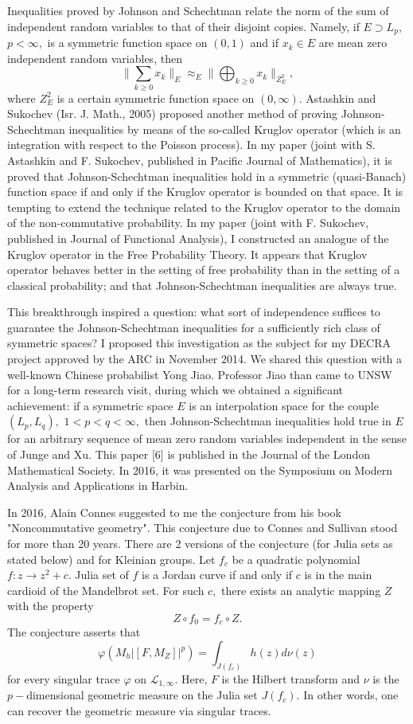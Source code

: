 \documentclass[12pt]{article}
\begin{document}
Inequalities proved by Johnson and Schechtman relate the norm of the sum of independent random variables to that of their disjoint copies. Namely, if $E\supset L_p,$ $p<\infty,$ is a symmetric function space on $(0,1)$ and if $x_k\in E$ are mean zero independent random variables, then
$$\|\sum_{k\geq0}x_k\|_E\approx_E\|\bigoplus_{k\geq0}x_k\|_{Z_E^2},$$
where $Z_E^2$ is a certain symmetric function space on $(0,\infty).$ Astashkin and Sukochev (Isr. J. Math., 2005) proposed another method of proving Johnson-Schechtman inequalities by means of the so-called Kruglov operator (which is an integration with respect to the Poisson process). In my paper (joint with S. Astashkin and F. Sukochev, published in Pacific Journal of Mathematics), it is proved that Johnson-Schechtman inequalities hold in a symmetric (quasi-Banach) function space if and only if the Kruglov operator is bounded on that space. It is tempting to extend the technique related to the Kruglov operator to the domain of the non-commutative probability. In my paper (joint with F. Sukochev, published in Journal of Functional Analysis), I constructed an analogue of the Kruglov operator in the Free Probability Theory. It appears that Kruglov operator behaves better in the setting of free probability than in the setting of a classical probability; and that Johnson-Schechtman inequalities are always true.

This breakthrough inspired a question: what sort of independence suffices to guarantee the Johnson-Schechtman inequalities for a sufficiently rich class of symmetric spaces?  I proposed this investigation as the subject for my DECRA project approved by the ARC in November 2014. We shared this question with a well-known Chinese probabilist Yong Jiao. Professor Jiao than came to UNSW for a long-term research visit, during which we obtained a significant achievement: if a symmetric space $E$ is an interpolation space for the couple $(L_p,L_q),$ $1<p<q<\infty,$ then Johnson-Schechtman inequalities hold true in $E$ for an arbitrary sequence of mean zero random variables independent in the sense of Junge and Xu. This paper [6] is published in the Journal of the London Mathematical Society. In 2016, it was presented on the Symposium on Modern Analysis and Applications in Harbin.

In 2016, Alain Connes suggested to me the conjecture from his book "Noncommutative geometry". This conjecture due to Connes and Sullivan stood for more than 20 years. There are 2 versions of the conjecture (for Julia sets as stated below) and for Kleinian groups. Let $f_c$ be a quadratic polynomial $f:z\to z^2+c.$ Julia set of $f$ is a Jordan curve if and only if $c$ is in the main cardioid of the Mandelbrot set. For such $c,$ there exists an analytic mapping $Z$ with the property
$$Z\circ f_0=f_c\circ Z.$$
The conjecture asserts that
$$\varphi(M_h|[F,M_Z]|^p)=\int_{J(f_c)}h(z)d\nu(z)$$
for every singular trace $\varphi$ on $\mathcal{L}_{1,\infty}.$ Here, $F$ is the Hilbert transform and $\nu$ is the $p-$dimensional geometric measure on the Julia set $J(f_c).$ In other words, one can recover the geometric measure via singular traces.
\end{document}
